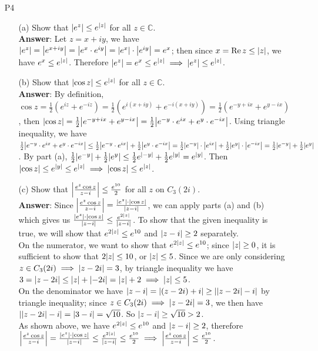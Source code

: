 \documentclass{article}
\begin{document}
\newpage
\begin{itemize}
    \item [P4]
          \begin{itemize}
              \item [(a)] Show that $\abs{e^z}\leq e^{\abs{z}}$ for all $z\in\mathbb{C}$.\\
              \textbf{Answer}: Let $z=x+iy$, we have $\abs{e^z}=\abs{e^{x+iy}}=\abs{e^x\cdot e^{iy}}=\abs{e^x}\cdot\abs{e^{iy}}=e^x$; then since $x=\Re z\leq\abs{z}$, we have $e^x\leq e^{\abs{z}}$. Therefore $\abs{e^z}=e^x\leq e^{\abs{z}}\implies\abs{e^z}\leq e^{\abs{z}}$.
              \item [(b)] Show that $\abs{\cos z}\leq e^{\abs{z}}$ for all $z\in\mathbb{C}$.\\
              \textbf{Answer}: By definition, $\cos z=\frac{1}{2}(e^{iz}+e^{-iz})=\frac{1}{2}(e^{i(x+iy)}+e^{-i(x+iy)})=\frac{1}{2}(e^{-y+ix}+e^{y-ix})$, then $\abs{\cos z}=\frac{1}{2}\abs{e^{-y+ix}+e^{y-ix}}=\frac{1}{2}\abs{e^{-y}\cdot e^{ix}+e^{y}\cdot e^{-ix}}$. Using triangle inequality, we have $\frac{1}{2}\abs{e^{-y}\cdot e^{ix}+e^{y}\cdot e^{-ix}}\leq\frac{1}{2}\abs{e^{-y}\cdot e^{ix}}+\frac{1}{2}\abs{e^{y}\cdot e^{-ix}}=\frac{1}{2}\abs{e^{-y}}\cdot\abs{e^{ix}}+\frac{1}{2}\abs{e^{y}}\cdot\abs{e^{-ix}}=\frac{1}{2}\abs{e^{-y}}+\frac{1}{2}\abs{e^{y}}$. By part (a), $\frac{1}{2}\abs{e^{-y}}+\frac{1}{2}\abs{e^{y}}\leq\frac{1}{2}e^{\abs{-y}}+\frac{1}{2}e^{\abs{y}}=e^{\abs{y}}$. Then $\abs{\cos z}\leq e^{\abs{y}}\leq e^{\abs{z}}\implies\abs{\cos z}\leq e^{\abs{z}}$.
              \item [(c)] Show that $\abs{\frac{e^z\cos z}{z-i}}\leq\frac{e^{10}}{2}$ for all $z$ on $C_3(2i)$.\\
              \textbf{Answer}: Since $\abs{\frac{e^z\cos z}{z-i}}=\frac{\abs{e^z}\cdot\abs{\cos z}}{\abs{z-i}}$, we can apply parts (a) and (b) which gives us $\frac{\abs{e^z}\cdot\abs{\cos z}}{\abs{z-i}}\leq\frac{e^{2\abs{z}}}{\abs{z-i}}$. To show that the given inequality is true, we will show that $e^{2\abs{z}}\leq e^{10}$ and $\abs{z-i}\geq 2$ separately.\\
              On the numerator, we want to show that $e^{2\abs{z}}\leq e^{10}$; since $\abs{z}\geq 0$, it is sufficient to show that $2\abs{z}\leq 10$, or $\abs{z}\leq 5$. Since we are only considering $z\in C_3(2i)\implies\abs{z-2i}=3$, by triangle inequality we have $3=\abs{z-2i}\leq\abs{z}+\abs{-2i}=\abs{z}+2\implies\abs{z}\leq 5$.\\
              On the denominator we have $\abs{z-i}=\abs{(z-2i)+i}\geq\abs{\abs{z-2i}-i}$ by triangle inequality; since $z\in C_3(2i)\implies\abs{z-2i}=3$, we then have $\abs{\abs{z-2i}-i}=\abs{3-i}=\sqrt{10}$. So $\abs{z-i}\geq\sqrt{10}>2$.\\
              As shown above, we have $e^{2\abs{z}}\leq e^{10}$ and $\abs{z-i}\geq 2$, therefore $\abs{\frac{e^z\cos z}{z-i}}=\frac{\abs{e^z}\cdot\abs{\cos z}}{\abs{z-i}}\leq\frac{e^{2\abs{z}}}{\abs{z-i}}\leq\frac{e^{10}}{2}\implies\abs{\frac{e^z\cos z}{z-i}}\leq\frac{e^{10}}{2}$.
          \end{itemize}
\end{itemize}
\end{document}
